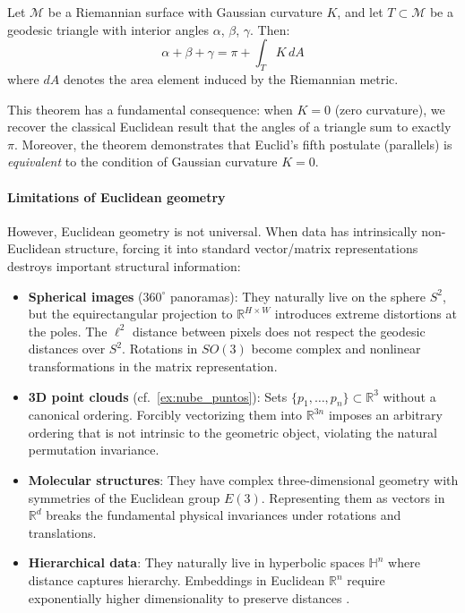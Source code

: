\begin{theorem}\label{thm:gauss_bonnet_triangulo}
Let $\mathcal{M}$ be a Riemannian surface with Gaussian curvature $K$, and let $T \subset \mathcal{M}$ be a geodesic triangle with interior angles $\alpha$, $\beta$, $\gamma$. Then:
\begin{equation}\label{eq:gauss_bonnet_triangulo}
\alpha + \beta + \gamma = \pi + \int_T K \, dA
\end{equation}
where $dA$ denotes the area element induced by the Riemannian metric.
\end{theorem}

This theorem \citep{lee2018introduction} has a fundamental consequence: when $K = 0$ (zero curvature), we recover the classical Euclidean result that the angles of a triangle sum to exactly $\pi$. Moreover, the theorem demonstrates that Euclid's fifth postulate (parallels) is \textit{equivalent} to the condition of Gaussian curvature $K = 0$.

\paragraph{Limitations of Euclidean geometry}

However, Euclidean geometry is not universal. When data has intrinsically non-Euclidean structure, forcing it into standard vector/matrix representations destroys important structural information:

\begin{itemize}
    \item \textbf{Spherical images} ($360^\circ$ panoramas): They naturally live on the sphere $S^2$, but the equirectangular projection to $\mathbb{R}^{H \times W}$ introduces extreme distortions at the poles. The $\ell^2$ distance between pixels does not respect the geodesic distances over $S^2$. Rotations in $SO(3)$ become complex and nonlinear transformations in the matrix representation.

    \item \textbf{3D point clouds} (cf.~\autoref{ex:nube_puntos}): Sets $\{p_1, \ldots, p_n\} \subset \mathbb{R}^3$ without a canonical ordering. Forcibly vectorizing them into $\mathbb{R}^{3n}$ imposes an arbitrary ordering that is not intrinsic to the geometric object, violating the natural permutation invariance.

    \item \textbf{Molecular structures}: They have complex three-dimensional geometry with symmetries of the Euclidean group $E(3)$. Representing them as vectors in $\mathbb{R}^d$ breaks the fundamental physical invariances under rotations and translations.

    \item \textbf{Hierarchical data}: They naturally live in hyperbolic spaces $\mathbb{H}^n$ where distance captures hierarchy. Embeddings in Euclidean $\mathbb{R}^n$ require exponentially higher dimensionality to preserve distances \citep{nickel2017poincare}.
\end{itemize}

